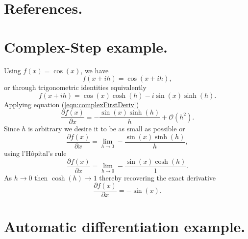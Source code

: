 \documentclass[preprint,12pt]{elsarticle}
\begin{document}

\section{References.}




\appendix
\renewcommand*{\thesection}{\Alph{section}}
%
\section{Complex-Step example.}
\label{sec:appendixA}
%
Using $f(x) = \cos(x)$, we have
%
\[
f (x + i h) = \cos(x + i h),
\]
%
or through trigonometric identities equivalently
%
\[
f(x + i h) = \cos(x) \cosh(h) - i \sin(x) \sinh(h).
\]
%
Applying equation (\ref{eqn:complexFirstDeriv})
\[
    \frac{\partial f(x)}{\partial x} = - \frac{\sin(x) \sinh(h)}{h} + \mathcal{O}(h^2).
\]
Since $h$ is arbitrary we desire it to be as small as possible or
\[
\frac{\partial f(x)}{\partial x} = \lim_{h \to 0} - \frac{\sin(x) \sinh(h)}{h},
\]
using l'H\^opital's rule
\[
\frac{\partial f(x)}{\partial x} = \lim_{h \to 0} - \frac{\sin(x) \cosh(h)}{1}.
\]
As $h \to 0$ then $\cosh(h) \to 1$ thereby recovering the exact derivative
\[
\frac{\partial f(x)}{\partial x} =-\sin(x).
\]

\section{Automatic differentiation example.}
\label{sec:appendixB}
\end{document}
